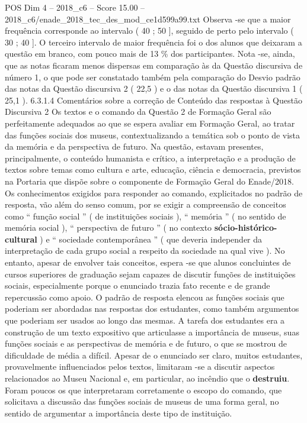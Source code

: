 \begin{textsample}{POS Dim 4 – 2018\_c6 – Score 15.00 – 2018\_c6/enade\_2018\_tec\_des\_mod\_ce1d599a99.txt}
Observa -se que a maior frequência corresponde ao intervalo ( 40 ; 50 ], seguido de perto pelo intervalo ( 30 ; 40 ].
O terceiro intervalo de maior frequência foi o dos alunos que deixaram a questão em branco, com pouco mais de 13 \% dos participantes.
Nota -se, ainda, que as notas ficaram menos dispersas em comparação às da Questão discursiva de número 1, o que pode ser constatado também pela comparação do Desvio padrão das notas da Questão discursiva 2 ( 22,5 ) e o das notas da Questão discursiva 1 ( 25,1 ). 6.3.1.4 Comentários sobre a correção de Conteúdo das respostas à Questão Discursiva 2 Os textos e o comando da Questão 2 de Formação Geral são perfeitamente adequados ao que se espera avaliar em Formação Geral, ao tratar das funções sociais dos museus, contextualizando a temática sob o ponto de vista da memória e da perspectiva de futuro.
Na questão, estavam presentes, principalmente, o conteúdo humanista e crítico, a interpretação e a produção de textos sobre temas como cultura e arte, educação, ciência e democracia, previstos na Portaria que dispõe sobre o componente de Formação Geral do Enade/2018.
Os conhecimentos exigidos para responder ao comando, explicitados no padrão de resposta, vão além do senso comum, por se exigir a compreensão de conceitos como “ função social ” ( de instituições sociais ), “ memória ” ( no sentido de memória social ), “ perspectiva de futuro ” ( no contexto \textbf{sócio-histórico-cultural} ) e “ sociedade contemporânea ” ( que deveria independer da interpretação de cada grupo social a respeito da sociedade na qual vive ).
No entanto, apesar de envolver tais conceitos, espera -se que alunos concluintes de cursos superiores de graduação sejam capazes de discutir funções de instituições sociais, especialmente porque o enunciado trazia fato recente e de grande repercussão como apoio.
O padrão de resposta elencou as funções sociais que poderiam ser abordadas nas respostas dos estudantes, como também argumentos que poderiam ser usados ao longo das mesmas.
A tarefa dos estudantes era a construção de um texto expositivo que articulasse a importância de museus, suas funções sociais e as perspectivas de memória e de futuro, o que se mostrou de dificuldade de média a difícil.
Apesar de o enunciado ser claro, muitos estudantes, provavelmente influenciados pelos textos, limitaram -se a discutir aspectos relacionados ao Museu Nacional e, em particular, ao incêndio que o \textbf{destruiu}.
Foram poucos os que interpretaram corretamente o escopo do comando, que solicitava a discussão das funções sociais de museus de uma forma geral, no sentido de argumentar a importância deste tipo de instituição.

\end{textsample}

